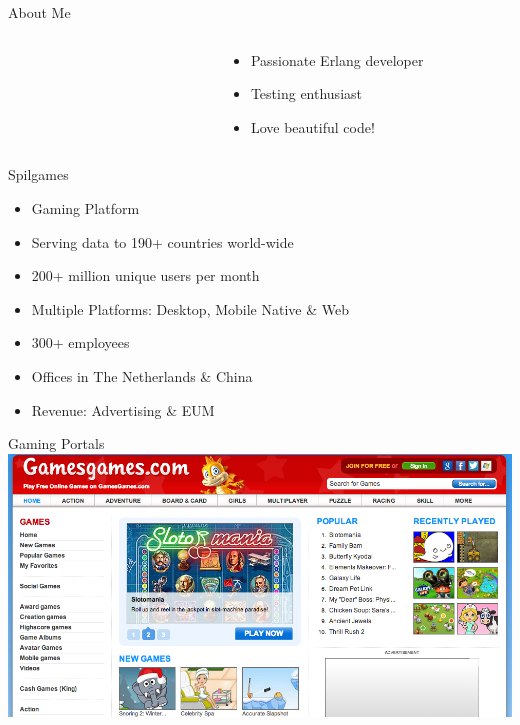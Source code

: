 \documentclass[aspectratio=43]{beamer}
\begin{document}
\begin{frame}{About Me}
\begin{columns}
\begin{column}[c]{0.2\textwidth}
        \end{column}
        \begin{column}[c]{0.05\textwidth}
        \end{column}
        \begin{column}[c]{0.7\textwidth}
            \begin{itemize}
                \item Passionate Erlang developer
                \item Testing enthusiast
                \item Love beautiful code!
            \end{itemize}
        \end{column}
    \end{columns}
\end{frame}

\begin{frame}{Spilgames}
    \begin{itemize}
       \item Gaming Platform
       \item Serving data to 190+ countries world-wide
       \item 200+ million unique users per month
       \item Multiple Platforms: Desktop, Mobile Native \& Web
       \item 300+ employees
       \item Offices in The Netherlands \& China
       \item Revenue: Advertising \& EUM
    \end{itemize}
\end{frame}

\begin{frame}{Gaming Portals}
    \includegraphics[width=\textwidth]{images/gamesgames.png}
\end{frame}
\end{document}
